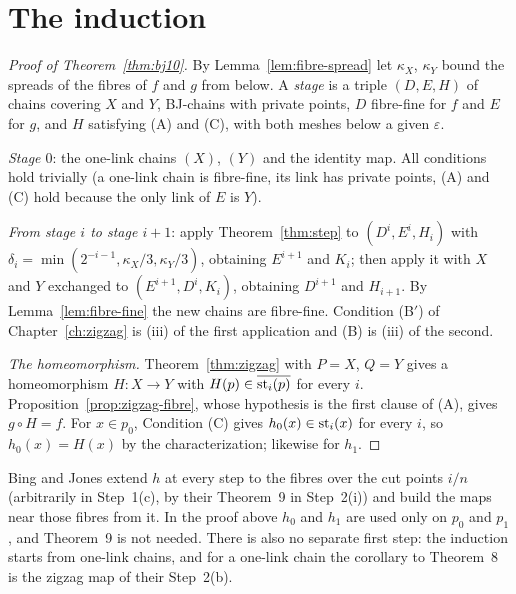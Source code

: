 \section{The induction}

\begin{proof}[Proof of Theorem~\ref{thm:bj10}]
By Lemma~\ref{lem:fibre-spread} let $\kappa_X$, $\kappa_Y$ bound the spreads of the fibres of $f$ and $g$ from below. A \emph{stage} is a triple $(D,E,H)$ of chains covering
$X$ and $Y$, BJ-chains with private points, $D$ fibre-fine for $f$ and $E$ for $g$, and $H$ satisfying (A) and (C), with both meshes below a given $\varepsilon$.

\emph{Stage $0$}: the one-link chains $(X)$, $(Y)$ and the identity map. All conditions hold trivially (a one-link chain is fibre-fine, its link has private points, (A) and
(C) hold because the only link of $E$ is $Y$).

\emph{From stage $i$ to stage $i+1$}: apply Theorem~\ref{thm:step} to $(D^i,E^i,H_i)$ with $\delta_i=\min(2^{-i-1},\kappa_X/3,\kappa_Y/3)$, obtaining $E^{i+1}$ and $K_i$;
then apply it with $X$ and $Y$ exchanged to $(E^{i+1},D^i,K_i)$, obtaining $D^{i+1}$ and $H_{i+1}$. By Lemma~\ref{lem:fibre-fine} the new chains are fibre-fine. Condition
(B$'$) of Chapter~\ref{ch:zigzag} is (iii) of the first application and (B) is (iii) of the second.

\emph{The homeomorphism.} Theorem~\ref{thm:zigzag} with $P=X$, $Q=Y$ gives a homeomorphism $H\colon X\to Y$ with $H(p)\in\overline{\operatorname{st}_i(p)}$ for every $i$.
Proposition~\ref{prop:zigzag-fibre}, whose hypothesis is the first clause of (A), gives $g\circ H=f$. For $x\in p_0$, Condition (C) gives $h_0(x)\in\operatorname{st}_i(x)$ for every $i$, so
$h_0(x)=H(x)$ by the characterization; likewise for $h_1$.
\end{proof}


\begin{remark}
Bing and Jones extend $h$ at every step to the fibres over the cut points $i/n$ (arbitrarily in Step~1(c), by their Theorem~9 in Step~2(i)) and build the maps near those
fibres from it. In the proof above $h_0$ and $h_1$ are used only on $p_0$ and $p_1$, and Theorem~9 is not needed. There is also no separate first step: the induction starts
from one-link chains, and for a one-link chain the corollary to Theorem~8 is the zigzag map of their Step~2(b).
\end{remark}

